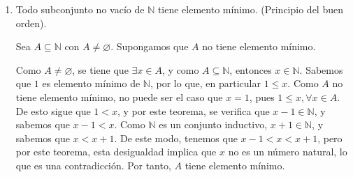 \documentclass[11pt]{article}
\newcommand{\N}{\mathbb{N}}
\newcommand{\defined}{\coloneqq}
\let\emptyset\varnothing
\let\set\Set
\let\subset\subseteq
\begin{document}
\begin{enumerate}[label=\alph*)]
\begin{enumerate}[label=\roman*)]
        \item Todo subconjunto no vacío de $\N$ tiene elemento mínimo. (Principio del buen orden).
        
        Sea $A\subset \N$ con $A\neq \emptyset$. Supongamos que $A$ no tiene elemento mínimo.
        
        Como $A\neq \emptyset$, se tiene que $\exists x\in A$, y como $A\subset \N$, entonces $x\in \N$. Sabemos que $1$ es elemento mínimo de $\N$, por lo que, en particular $1\leq x$. Como $A$ no tiene elemento mínimo, no puede ser el caso que $x=1$, pues $1\leq x,\forall x\in A$. De esto sigue que $1<x$, y por este teorema, se verifica que $x-1\in \N$, y sabemos que $x-1<x$. Como $\N$ es un conjunto inductivo, $x+1\in \N$, y sabemos que $x<x+1$. De este modo, tenemos que $x-1<x<x+1$, pero por este teorema, esta desigualdad implica que $x$ no es un número natural, lo que es una contradicción. Por tanto, $A$ tiene elemento mínimo.

\end{enumerate}
\end{enumerate}
\end{document}
